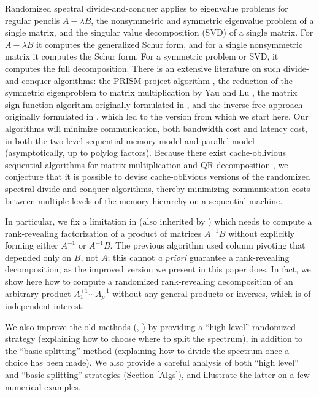 \documentclass{article}
\theoremstyle{definition}
\begin{document}
Randomized spectral divide-and-conquer applies to eigenvalue problems for regular pencils
$A - \lambda B$, the nonsymmetric and symmetric eigenvalue problem of a single matrix,
and the singular value decomposition (SVD) of a single matrix. For $A - \lambda B$
it computes the generalized Schur form, and for a single nonsymmetric matrix
it computes the Schur form. For a symmetric problem or SVD, it computes the
full decomposition.
There is an extensive literature on such divide-and-conquer algorithms:
the PRISM project algorithm 
\cite{auslandertsao,bischofledermansuntsao}, 
the reduction of the symmetric eigenproblem to matrix multiplication by Yau and Lu \cite{luyau}, 
the matrix sign function algorithm originally formulated in \cite{howland,Roberts},
and the inverse-free approach originally formulated in
\cite{godunov86,bulgakov88,malyshev89,malyshev92,malyshev93},
which led to the version \cite{baidemmelgu94,DDH07} 
from which we start here. Our algorithms will minimize communication,
both bandwidth cost and latency cost, in both the two-level sequential memory model and
parallel model (asymptotically, up to polylog factors).  
Because there exist cache-oblivious sequential algorithms for matrix multiplication \cite{FLPR99} and QR decomposition \cite{FrensWise03}, we conjecture that it is possible to devise cache-oblivious versions of the randomized spectral divide-and-conquer algorithms, thereby minimizing communication costs between multiple levels of the memory hierarchy on a sequential machine.

In particular, we fix a limitation in \cite{baidemmelgu94} (also inherited
by \cite{DDH07}) which needs to compute a rank-revealing
factorization of a product of matrices $A^{-1}B$ without explicitly
forming either $A^{-1}$ or $A^{-1}B$. The previous algorithm used
column pivoting that depended only on $B$, not $A$; this cannot \emph{a priori}
guarantee a rank-revealing decomposition, as the improved version we present in this paper does. In fact,
we show here how to compute a randomized rank-revealing decomposition 
of an arbitrary product $A_1^{\pm 1} \cdots A_p^{\pm 1}$ without 
any general products or inverses, which is of independent interest.

We also improve the old methods (\cite{baidemmelgu94}, \cite{DDH07}) by providing a ``high level'' randomized 
strategy (explaining how to choose where to split the spectrum), in addition 
to the ``basic splitting'' method (explaining how to divide the spectrum 
once a choice has been made). We also provide a careful analysis of 
both ``high level'' and ``basic splitting'' strategies 
(Section \ref{Algs}), and illustrate the latter on a few numerical examples.
\end{document}
